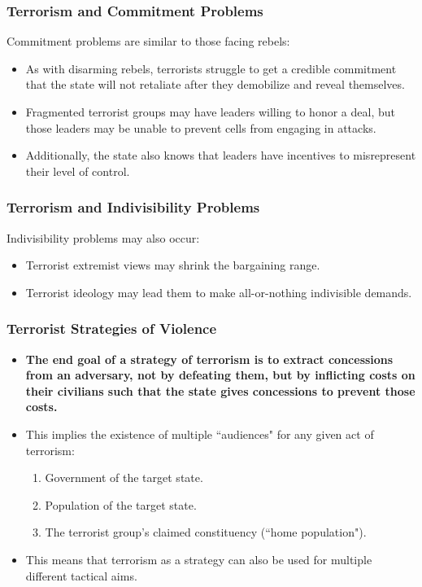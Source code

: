 \documentclass{beamer}
\begin{document}
\begin{frame} 
	\frametitle{\LARGE{Terrorism and Commitment Problems}}
Commitment problems are similar to those facing rebels:
	\begin{itemize}
		\item As with disarming rebels, terrorists struggle to get a credible commitment that the state will not retaliate after they demobilize and reveal themselves. \pause
		\item Fragmented terrorist groups may have leaders willing to honor a deal, but those leaders may be unable to prevent cells from engaging in attacks. \pause
		\item Additionally, the state also knows that leaders have incentives to misrepresent their level of control. 
	\end{itemize}
\end{frame}

\begin{frame} 
	\frametitle{\LARGE{Terrorism and Indivisibility Problems}}
Indivisibility problems may also occur:
	\begin{itemize}
		\item Terrorist extremist views may shrink the bargaining range. \pause
		\item Terrorist ideology may lead them to make all-or-nothing indivisible demands.
	\end{itemize}
\end{frame}

\begin{frame} 
	\frametitle{\LARGE{Terrorist Strategies of Violence}}
	\begin{itemize}
		\item \textbf{The end goal of a strategy of terrorism is to extract concessions from an adversary, not by defeating them, but by inflicting costs on their civilians such that the state gives concessions to prevent those costs.} \pause
		\item This implies the existence of multiple ``audiences" for any given act of terrorism:
		\begin{enumerate}
			\item Government of the target state.
			\item Population of the target state.
			\item The terrorist group's claimed constituency (``home population"). \pause
		\end{enumerate}
	\item This means that terrorism as a strategy can also be used for multiple different tactical aims.
	\end{itemize}
\end{frame}
\end{document}
